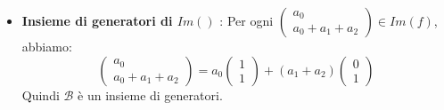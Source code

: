 \documentclass[a4paper]{article}
\theoremstyle{break}
\theoremstyle{break}
\theoremstyle{break}
\theoremstyle{break}
\begin{document}
\begin{example}
\begin{itemize}
  \item \textbf{Insieme di generatori di \( Im() \) }:
    Per ogni \( \begin{pmatrix} a_0\\a_0+a_1+a_2 \end{pmatrix} \in Im(f) \), abbiamo:
    \[
    \begin{pmatrix} 
      a_0\\
      a_0 + a_1 + a_2
    \end{pmatrix} 
    =
    a_0 \begin{pmatrix} 1\\1 \end{pmatrix} 
    +
    (a_1 + a_2) \begin{pmatrix} 0\\1 \end{pmatrix}
    \] 
    Quindi \( \mathcal{B} \) è un insieme di generatori.
\end{itemize}
\end{example}
\end{document}
